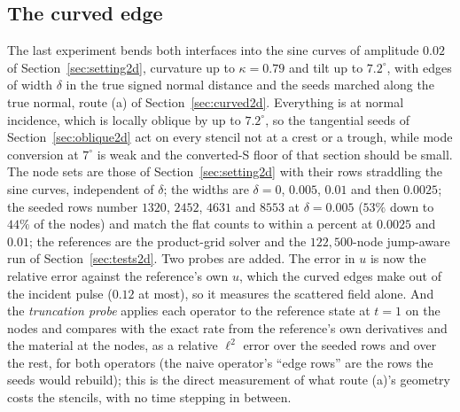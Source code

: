 \documentclass[11pt]{amsart}
\theoremstyle{definition}
\theoremstyle{remark}
\begin{document}
\FloatBarrier
\subsection{The curved edge}
\label{sec:curvedresults}
The last experiment bends both interfaces into the sine curves of
amplitude $0.02$ of Section~\ref{sec:setting2d}, curvature up to
$\kappa = 0.79$ and tilt up to $7.2^\circ$, with edges of width $\delta$
in the true signed normal distance and the seeds marched along the true
normal, route (a) of Section~\ref{sec:curved2d}. Everything is at normal
incidence, which is locally oblique by up to $7.2^\circ$, so the
tangential seeds of Section~\ref{sec:oblique2d} act on every stencil not
at a crest or a trough, while mode conversion at $7^\circ$ is weak and
the converted-S floor of that section should be small. The node sets are
those of Section~\ref{sec:setting2d} with their rows straddling the sine curves, independent of $\delta$; the widths are $\delta = 0$, $0.005$,
$0.01$ and then $0.0025$; the seeded rows number $1320$, $2452$, $4631$
and $8553$ at $\delta = 0.005$ ($53\%$ down to $44\%$ of the nodes) and
match the flat counts to within a percent at $0.0025$ and $0.01$; the
references are the product-grid solver and the $122{,}500$-node
jump-aware run of Section~\ref{sec:tests2d}. Two probes are added. The
error in $u$ is now the relative error against the reference's own $u$,
which the curved edges make out of the incident pulse ($0.12$ at most),
so it measures the scattered field alone. And the \emph{truncation
probe} applies each operator to the reference state at $t = 1$ on the
nodes and compares with the exact rate from the reference's own
derivatives and the material at the nodes, as a relative $\ell^2$ error
over the seeded rows and over the rest, for both operators (the naive
operator's ``edge rows'' are the rows the seeds would rebuild); this is
the direct measurement of what route (a)'s geometry costs the stencils,
with no time stepping in between.
\end{document}
